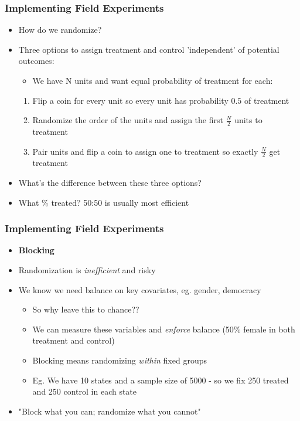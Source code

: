 \documentclass[xcolor=x11names,compress]{beamer}\usepackage[]{graphicx}\usepackage[]{color}
\renewcommand{\(}{\begin{columns}}
\renewcommand{\)}{\end{columns}}
\newcommand{\<}[1]{\begin{column}{#1}}
\renewcommand{\>}{\end{column}}
\begin{document}
\begin{frame}
\frametitle{Implementing Field Experiments}
\begin{itemize}
\item How do we randomize?
\pause
\item Three options to assign treatment and control 'independent' of potential outcomes:
\pause
\begin{itemize}
\item We have N units and want equal probability of treatment for each:
\end{itemize}
\begin{enumerate}
\item Flip a coin for every unit so every unit has probability $0.5$ of treatment
\pause
\item Randomize the order of the units and assign the first $\frac{N}{2}$ units to treatment
\pause
\item Pair units and flip a coin to assign one to treatment so exactly $\frac{N}{2}$ get treatment
\pause
\end{enumerate}
\item What's the difference between these three options?
\pause
\item What \% treated? 50:50 is usually most efficient
\end{itemize}
\end{frame}

\begin{frame}
\frametitle{Implementing Field Experiments}
\begin{itemize}
\item \textbf{Blocking}
\pause
\item Randomization is \textit{inefficient} and risky
\pause
\item We know we need balance on key covariates, eg. gender, democracy
\begin{itemize}
\item So why leave this to chance??
\pause
\item We can measure these variables and \textit{enforce} balance (50\% female in both treatment and control)
\pause
\item Blocking means randomizing \textit{within} fixed groups
\pause
\item Eg. We have 10 states and a sample size of 5000 - so we fix 250 treated and 250 control in each state
\end{itemize}
\item "Block what you can; randomize what you cannot"
\end{itemize}
\end{frame}
\end{document}
